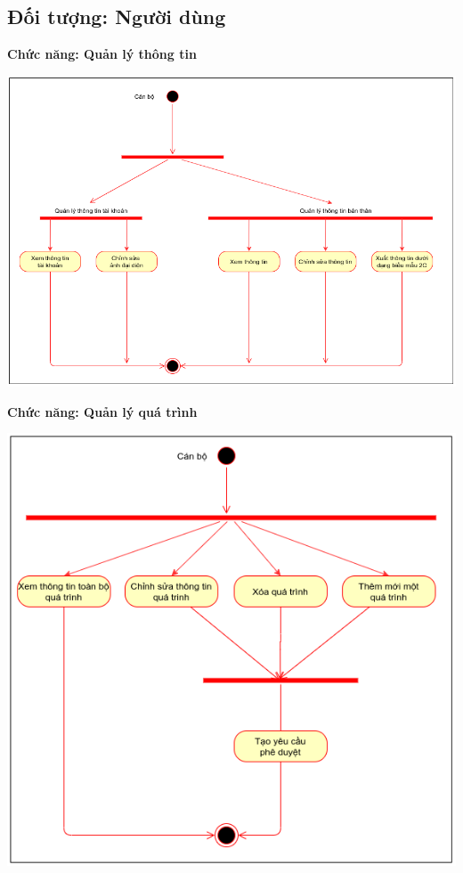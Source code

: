 \subsection{Đối tượng: Người dùng}
\textbf{Chức năng: Quản lý thông tin}
\begin{center}
  \captionsetup{type=figure}
  \includegraphics[scale=0.5]{img/UML/User/activityQLThongTin.png}
\end{center}
\textbf{Chức năng: Quản lý quá trình}
\begin{center}
  \captionsetup{type=figure}
  \includegraphics[scale=0.55]{img/UML/User/activityQuanLyQT.png}
\end{center}